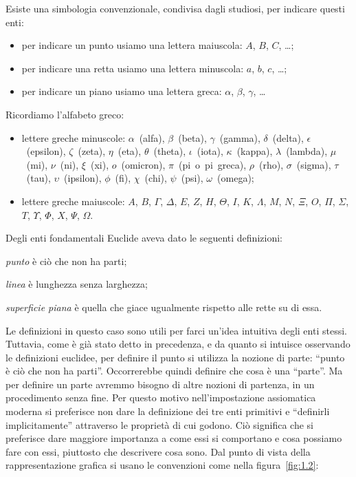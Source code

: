 Esiste una simbologia convenzionale, condivisa dagli studiosi, per 
indicare questi enti:
\begin{itemize}
\item per indicare un punto usiamo una lettera maiuscola: \(A\), \(B\), 
\(C\), \ldots;
\item per indicare una retta usiamo una lettera minuscola: \(a\), \(b\), 
\(c\), \ldots;
\item per indicare un piano usiamo una lettera greca: \(\alpha\), 
\(\beta\), \(\gamma\), \ldots
\end{itemize}

Ricordiamo l'alfabeto greco:
\begin{itemize}
\item lettere greche minuscole:  \(\alpha\)~(alfa),  \(\beta\)~(beta),  
\(\gamma\)~(gamma),  \(\delta\)~(delta), \(\epsilon\)~(epsilon), 
\(\zeta\)~(zeta), \(\eta\)~(eta), \(\theta\)~(theta),  \(\iota\)~(iota),  
\(\kappa\)~(kappa), \(\lambda\)~(lambda), \(\mu\)~(mi), \(\nu\)~(ni),  
\(\xi\)~(xi), \(o\)~(omicron), \(\pi\)~(pi~o~pi~greca), \(\rho\)~(rho), 
\(\sigma\)~(sigma), \(\tau\)~(tau), \(\upsilon\)~(ipsilon), \(\phi\)~(fi), 
\(\chi\)~(chi), \(\psi\)~(psi), \(\omega\)~(omega);
\item lettere greche maiuscole: \(A\), \(B\), \( \Gamma \), \( \Delta \), \( E 
\), \( Z \), \( H \), \( \Theta \), \( I \), \( K \), \( \Lambda \), \( M \), \( N \), 
\( \Xi \), \( O \), \( \Pi \), \( \Sigma \), \( T \), \( \Upsilon \), \( \Phi \), \( 
X \), \( \Psi \), \(\Omega \).
\end{itemize}

Degli enti fondamentali Euclide aveva dato le seguenti definizioni:
\begin{itemize*}
\item \emph{punto} è ciò che non ha parti;
\item \emph{linea} è lunghezza senza larghezza;
\item \emph{superficie piana} è quella che giace ugualmente rispetto 
alle rette su di essa.
\end{itemize*}
Le definizioni in questo caso sono utili per farci un'idea intuitiva 
degli enti stessi. Tuttavia, come è già stato detto in precedenza, e 
da quanto si intuisce osservando le definizioni euclidee, per 
definire il punto si utilizza la nozione di parte: ``punto è ciò che 
non ha parti''. Occorrerebbe quindi definire che cosa è una 
``parte''. Ma per definire un parte avremmo bisogno di altre nozioni 
di partenza, in un procedimento senza fine. Per questo motivo 
nell'impostazione assiomatica moderna si preferisce non dare la 
definizione dei tre enti primitivi e ``definirli implicitamente'' 
attraverso le proprietà di cui godono. Ciò significa che si 
preferisce dare maggiore importanza a come essi si comportano e cosa 
possiamo fare con essi, piuttosto che descrivere cosa sono.
Dal punto di vista della rappresentazione grafica si usano le 
convenzioni come nella figura~\ref{fig:1.2}:
% 

